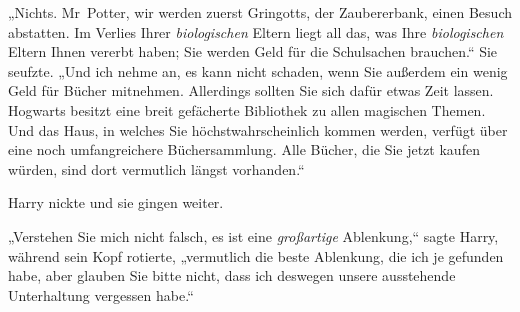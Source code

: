 „Nichts. Mr~Potter, wir werden zuerst Gringotts, der Zaubererbank, einen Besuch abstatten. Im Verlies Ihrer \emph{biologischen} Eltern liegt all das, was Ihre \emph{biologischen} Eltern Ihnen vererbt haben; Sie werden Geld für die Schulsachen brauchen.“ Sie seufzte. „Und ich nehme an, es kann nicht schaden, wenn Sie außerdem ein wenig Geld für Bücher mitnehmen. Allerdings sollten Sie sich dafür etwas Zeit lassen. Hogwarts besitzt eine breit gefächerte Bibliothek zu allen magischen Themen. Und das Haus, in welches Sie höchstwahrscheinlich kommen werden, verfügt über eine noch umfangreichere Büchersammlung. Alle Bücher, die Sie jetzt kaufen würden, sind dort vermutlich längst vorhanden.“

Harry nickte und sie gingen weiter.

„Verstehen Sie mich nicht falsch, es ist eine \emph{großartige} Ablenkung,“ sagte Harry, während sein Kopf rotierte, „vermutlich die beste Ablenkung, die ich je gefunden habe, aber glauben Sie bitte nicht, dass ich deswegen unsere ausstehende Unterhaltung vergessen habe.“


